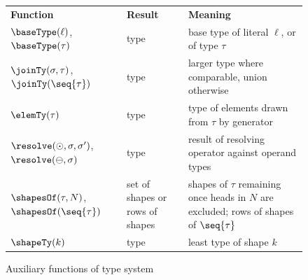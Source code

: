 \begin{figure}[t]
\begin{center}
\small
\begin{tabular}{>{\raggedright\arraybackslash}p{}>{\raggedright\arraybackslash}p{}>{\raggedright\arraybackslash}p{}}
\textbf{Function} & \textbf{Result} & \textbf{Meaning} \\[1mm]
$\baseType(\ell)$, $\baseType(\tau)$ & type & base type of literal $\ell$, or of type $\tau$ \\
$\joinTy(\sigma, \tau)$, $\joinTy(\seq{\tau})$ & type & larger type where comparable, union otherwise \\
$\elemTy(\tau)$ & type & type of elements drawn from $\tau$ by generator \\
$\resolve(\odot, \sigma, \sigma')$, $\resolve(\ominus, \sigma)$ & type & result of resolving operator against operand types \\
$\shapesOf(\tau, N)$, $\shapesOf(\seq{\tau})$ & set of shapes or rows of shapes & shapes of $\tau$ remaining once heads in $N$ are excluded; rows of shapes of $\seq{\tau}$ \\
$\shapeTy(k)$ & type & least type of shape $k$ \\
\end{tabular}
\end{center}
\caption{Auxiliary functions of type system}
\label{fig:aux-types}
\end{figure}
